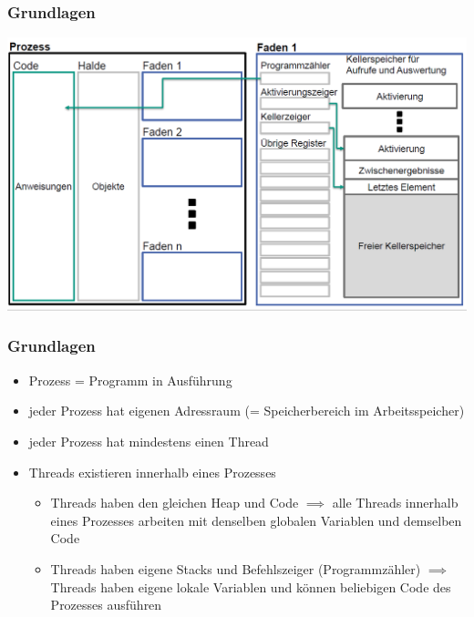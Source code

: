 \documentclass[18pt]{beamer}
\begin{document}
	\begin{frame}
		\frametitle{Grundlagen}
		\includegraphics[scale=0.34]{./pics/tut5/proc-thr.png}
	\end{frame}

	\begin{frame}
		\frametitle{Grundlagen}
		\begin{itemize}
			\item Prozess = Programm in Ausführung \pause
			\item jeder Prozess hat eigenen Adressraum (= Speicherbereich im Arbeitsspeicher) \pause
			\item jeder Prozess hat mindestens einen Thread \pause
			\item Threads existieren innerhalb eines Prozesses \pause 
			\begin{itemize}
				\item Threads haben den gleichen Heap und Code \pause 
					\linebreak $\implies$ alle Threads innerhalb eines Prozesses arbeiten mit denselben globalen Variablen und demselben Code \pause 
				\item Threads haben eigene Stacks und Befehlszeiger (Programmzähler) \pause 
					\linebreak $\implies$ Threads haben eigene lokale Variablen und können beliebigen Code des Prozesses ausführen
			\end{itemize}
		\end{itemize}
	\end{frame}
	
\end{document}
